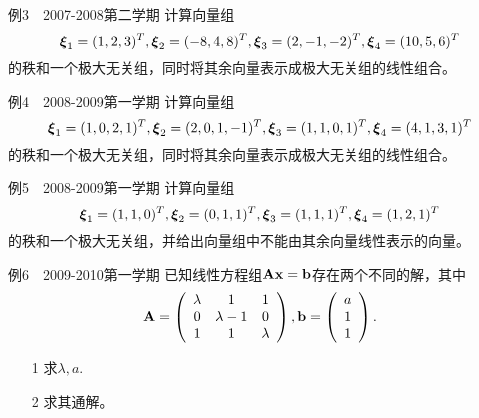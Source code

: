  \begin{frame}\ft{\subsecname}
   \begin{footnotesize}
    \begin{exampleblock}{例3~~2007-2008第二学期}
      计算向量组
      $$\boldsymbol{\xi}_1=(1,2,3)^T,\boldsymbol{\xi}_2=(-8,4,8)^T,\boldsymbol{\xi}_3=(2,-1,-2)^T,
      \boldsymbol{\xi}_4=(10,5,6)^T
      $$的秩和一个极大无关组，同时将其余向量表示成极大无关组的线性组合。
    \end{exampleblock}
%
%
%
    \begin{exampleblock}{例4~~2008-2009第一学期}
      计算向量组
      $$\boldsymbol{\xi}_1=(1,0,2,1)^T,\boldsymbol{\xi}_2=(2,0,1,-1)^T,\boldsymbol{\xi}_3=(1,1,0,1)^T,
      \boldsymbol{\xi}_4=(4,1,3,1)^T
      $$的秩和一个极大无关组，同时将其余向量表示成极大无关组的线性组合。
    \end{exampleblock}
  \end{footnotesize}
\end{frame}




\begin{frame}\ft{\subsecname}
  \begin{footnotesize}
    \begin{exampleblock}{例5~~2008-2009第一学期}
      计算向量组$$\boldsymbol{\xi}_1=(1,1,0)^T,\boldsymbol{\xi}_2=(0,1,1)^T,\boldsymbol{\xi}_3=(1,1,1)^T,
      \boldsymbol{\xi}_4=(1,2,1)^T$$的秩和一个极大无关组，并给出向量组中不能由其余向量线性表示的向量。
    \end{exampleblock}
%
%
    \begin{exampleblock}{例6~~2009-2010第一学期}
    已知线性方程组$\mathbf{A}\mathbf{x}=\mathbf{b}$存在两个不同的解，其中$$\mathbf{A}=\left(
    \begin{array}{ccc}
        \lambda&1&1\\
        0&\lambda-1&0\\
        1&1&\lambda
      \end{array}
    \right),\mathbf{b}=\left(
      \begin{array}{c}
        a\\1 \\1
      \end{array}
      \right).$$
      \begin{itemize}
      \item[1] 求$\lambda,a$.
      \item[2] 求其通解。
      \end{itemize}
    \end{exampleblock}

  \end{footnotesize}
\end{frame}


